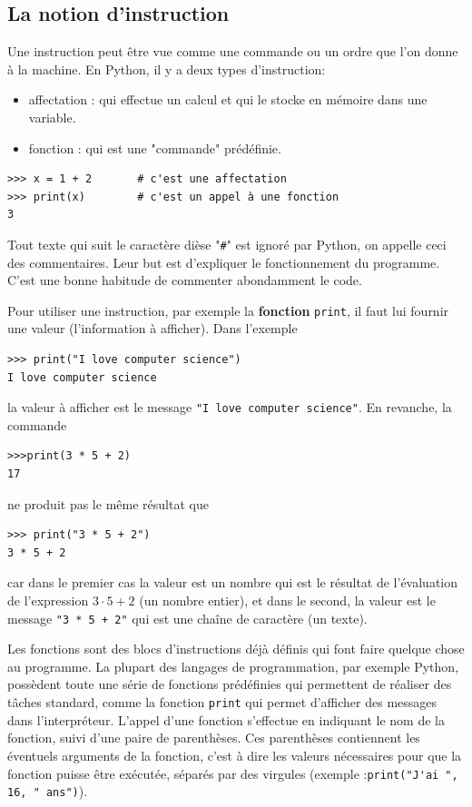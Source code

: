 \documentclass[11pt, a4paper]{book}
\begin{document}
\subsection{La notion d'instruction}
Une instruction peut être vue comme une commande ou un ordre que l'on donne à la machine. En Python, il y a deux types d’instruction:
\begin{itemize}
	\item affectation : qui effectue un calcul et qui le stocke en mémoire dans une variable.
	\item fonction    : qui est une "commande" prédéfinie. 
\end{itemize}
\begin{myexample}
	\vspace{-3mm}
	\begin{lstlisting}[numbers=none]
>>> x = 1 + 2       # c'est une affectation
>>> print(x)        # c'est un appel à une fonction
3
	\end{lstlisting}
	\vspace{-3mm}
\end{myexample}


\begin{eclairage}
	Tout texte qui suit le caractère dièse "\lstinline{#}" est ignoré par Python, on appelle ceci des commentaires. Leur but est d’expliquer le fonctionnement du programme. C’est une bonne habitude de commenter abondamment le code.
\end{eclairage}
Pour utiliser une instruction, par exemple la \textbf{fonction} \lstinline{print}, il faut lui fournir une valeur (l'information à afficher). Dans l'exemple
\begin{lstlisting}[numbers=none]
>>> print("I love computer science")
I love computer science
\end{lstlisting}
la valeur à afficher est le message \lstinline{"I love computer science"}. En revanche, la commande 
\begin{lstlisting}[numbers=none]
>>>print(3 * 5 + 2)
17
\end{lstlisting}
ne produit pas le même résultat que 
\begin{lstlisting}[numbers=none]
>>> print("3 * 5 + 2")
3 * 5 + 2
\end{lstlisting}
car dans le premier cas la valeur est un nombre qui est le résultat de l'évaluation de l'expression $3\cdot 5 +2$ (un nombre entier), et dans le second, la valeur est le message \lstinline{"3 * 5 + 2"} qui est une chaîne de caractère (un texte).
\begin{eclairage}
	Les fonctions sont des blocs d'instructions déjà définis qui font faire quelque chose au programme. La plupart des langages de programmation, par exemple Python, possèdent toute une série de fonctions prédéfinies qui permettent de réaliser des tâches standard, comme la fonction \lstinline{print} qui permet d'afficher des messages dans l'interpréteur. L'appel d'une fonction s'effectue en indiquant le nom	de la fonction, suivi d'une paire de parenthèses. Ces parenthèses contiennent les éventuels arguments de la fonction, c'est à dire les valeurs nécessaires pour que la fonction puisse être exécutée, séparés par des virgules (exemple :\lstinline{print("J'ai ", 16, " ans")}).
\end{eclairage}
\end{document}
